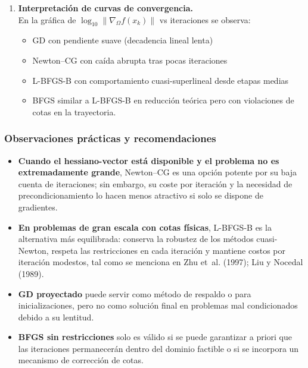 \documentclass[
  spanish,
  us-letterpaper,
]{scrreprt}
\providecommand{\tightlist}{%
  \setlength{\itemsep}{0pt}\setlength{\parskip}{0pt}}
\numberwithin{equation}{section}
\begin{document}
\begin{enumerate}
  Los métodos \textbf{GD proyectado} y \textbf{BFGS sin restricciones}
  no se incluyen en este análisis porque, en la práctica, GD converge
  demasiado lentamente para acercarse significativamente a la frontera
  en un número razonable de iteraciones, mientras que BFGS genera
  iteraciones infactibles antes de alcanzar dicha región.
\item
  \textbf{Interpretación de curvas de convergencia.}\\
  En la gráfica de \(\log_{10}\|\nabla_\Omega f(x_k)\|\) vs iteraciones
  se observa:

  \begin{itemize}
  \tightlist
  \item
    GD con pendiente suave (decadencia lineal lenta)
  \item
    Newton--CG con caída abrupta tras pocas iteraciones
  \item
    L-BFGS-B con comportamiento cuasi-superlineal desde etapas medias
  \item
    BFGS similar a L-BFGS-B en reducción teórica pero con violaciones de
    cotas en la trayectoria.
  \end{itemize}
\end{enumerate}

\subsubsection{Observaciones prácticas y
recomendaciones}\label{observaciones-pruxe1cticas-y-recomendaciones}

\begin{itemize}
\tightlist
\item
  \textbf{Cuando el hessiano-vector está disponible y el problema no es
  extremadamente grande}, Newton--CG es una opción potente por su baja
  cuenta de iteraciones; sin embargo, su coste por iteración y la
  necesidad de precondicionamiento lo hacen menos atractivo si solo se
  dispone de gradientes.\\
\item
  \textbf{En problemas de gran escala con cotas físicas}, L-BFGS-B es la
  alternativa más equilibrada: conserva la robustez de los métodos
  cuasi-Newton, respeta las restricciones en cada iteración y mantiene
  costos por iteración modestos, tal como se menciona en Zhu et~al.
  (1997); Liu y Nocedal (1989).\\
\item
  \textbf{GD proyectado} puede servir como método de respaldo o para
  inicializaciones, pero no como solución final en problemas mal
  condicionados debido a su lentitud.\\
\item
  \textbf{BFGS sin restricciones} solo es válido si se puede garantizar
  a priori que las iteraciones permanecerán dentro del dominio factible
  o si se incorpora un mecanismo de corrección de cotas.
\end{itemize}
\end{document}
